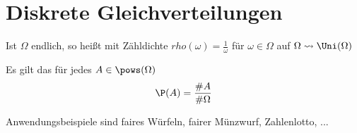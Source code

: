 \section{Diskrete Gleichverteilungen}

\begin{*erinnerung}
	Ist $\Omega$ endlich, so heißt \WMass mit Zähldichte $rho(\omega) = \frac{1}{\omega}$ für $\omega \in \Omega$  auf $\Omega \leadsto \Uni(\Omega)$
\end{*erinnerung}

Es gilt das für jedes $A \in \pows(\Omega)$
\begin{equation*}
	\P(A) = \frac{\# A}{\# \Omega}
\end{equation*}

Anwendungsbeispiele sind faires Würfeln, fairer Münzwurf, Zahlenlotto, ...